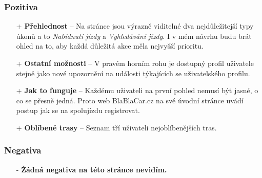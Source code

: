 \subsubsection*{Pozitiva}
\begin{itemize}
    \item[+] \textbf{Přehlednost} -- Na stránce jsou výrazně viditelné dva nejdůležitejší typy úkonů a to \textit{Nabídnutí jízdy} a \textit{Vyhledávání jízdy}. I v mém návrhu budu brát ohled na to, aby každá důležitá akce měla nejvyšší prioritu.
    \item[+] \textbf{Ostatní možnosti} -- V pravém horním rohu je dostupný profil uživatele stejně jako nové upozornění na události týkajících se uživatelského profilu.
    \item[+] \textbf{Jak to funguje} -- Každému uživateli na první pohled nemusí být jasné, o co se přesně jedná. Proto web BlaBlaCar.cz na své úvodní stránce uvádí postup jak se na spolujízdu registrovat.
    \item[+] \textbf{Oblíbené trasy} -- Seznam tří uživateli nejoblíbenějších tras.
\end{itemize}
\subsubsection*{Negativa}
\begin{itemize}
    \item[-] \textbf{Žádná negativa na této stránce nevidím.}
\end{itemize}



\newpage
